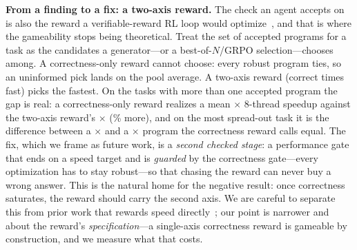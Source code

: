 \vspace{3pt}
\noindent\textbf{From a finding to a fix: a two-axis reward.}
The check an agent accepts on is also the reward a verifiable-reward RL loop would
optimize~\cite{rlvr,grpo}, and that is where the gameability stops being theoretical. Treat the
set of accepted programs for a task as the candidates a generator---or a best-of-$N$/GRPO
selection---chooses among. A correctness-only reward cannot choose: every robust program ties,
so an uninformed pick lands on the pool average. A two-axis reward (correct times fast) picks
the fastest. On the \NmultiTask{} tasks with more than one accepted program the gap is real: a
correctness-only reward realizes a mean \RewardRandom{}$\times$ 8-thread speedup against the
two-axis reward's \RewardTwoAxis{}$\times$ (\RewardGainPct{}\% more), and on the most spread-out
task it is the difference between a \RewardSpreadLo{}$\times$ and a \RewardSpreadHi{}$\times$
program the correctness reward calls equal. The fix, which we frame as future work, is a
\emph{second checked stage}: a performance gate that ends on a speed target and is
\emph{guarded} by the correctness gate---every optimization has to stay robust---so that chasing
the reward can never buy a wrong answer. This is the natural home for the negative result: once
correctness saturates, the reward should carry the second axis. We are careful to separate this
from prior work that rewards speed directly~\cite{pareval}; our point is narrower and about the
reward's \emph{specification}---a single-axis correctness reward is gameable by construction, and
we measure what that costs.

